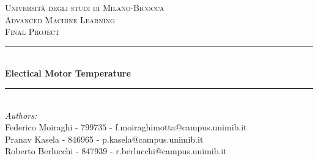 \begin{titlepage}

\newcommand{\HRule}{\rule{\linewidth}{0.5mm}} %

\center %
 

\textsc{\LARGE Università degli studi di Milano-Bicocca}\\[1cm] %
\textsc{\Large Advanced Machine Learning }\\[0.3cm] %
\textsc{\large Final Project}\\[0.1cm] %


\HRule \\[0.4cm]
{ \huge \bfseries Electical Motor Temperature}\\[0.2cm] %
\HRule \\[1.5cm]
 

\large
\emph{Authors:}\\
Federico Moiraghi - $799735$ - f.moiraghimotta@campus.unimib.it \\
Pranav Kasela - 846965 - p.kasela@campus.unimib.it \\
Roberto Berlucchi - 847939 - r.berlucchi@campus.unimib.it \\
[0.5cm] %




\end{titlepage}

